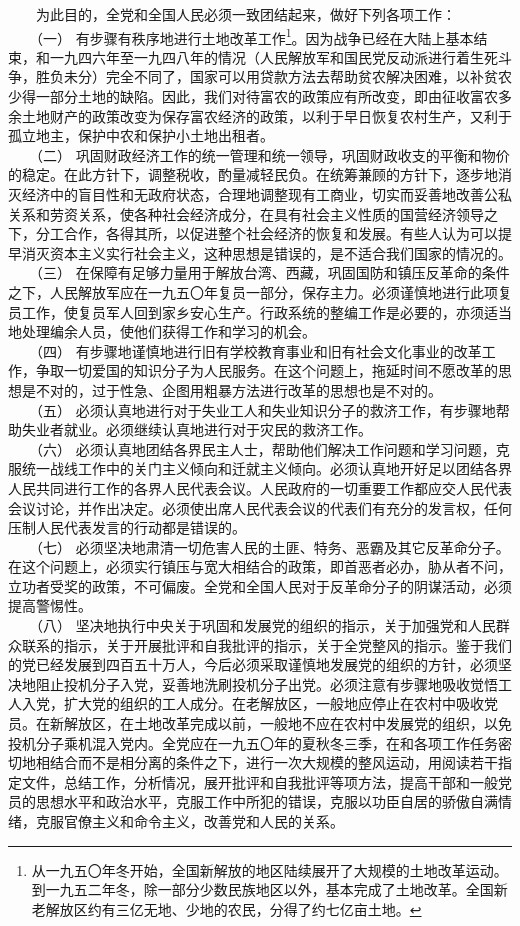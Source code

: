 \documentclass[cn,11pt,chinese]{elegantbook}
\begin{document}
　　为此目的，全党和全国人民必须一致团结起来，做好下列各项工作：\\
　　（一） 有步骤有秩序地进行土地改革工作\footnote[3]{从一九五〇年冬开始，全国新解放的地区陆续展开了大规模的土地改革运动。到一九五二年冬，除一部分少数民族地区以外，基本完成了土地改革。全国新老解放区约有三亿无地、少地的农民，分得了约七亿亩土地。}。因为战争已经在大陆上基本结束，和一九四六年至一九四八年的情况（人民解放军和国民党反动派进行着生死斗争，胜负未分）完全不同了，国家可以用贷款方法去帮助贫农解决困难，以补贫农少得一部分土地的缺陷。因此，我们对待富农的政策应有所改变，即由征收富农多余土地财产的政策改变为保存富农经济的政策，以利于早日恢复农村生产，又利于孤立地主，保护中农和保护小土地出租者。\\
　　（二） 巩固财政经济工作的统一管理和统一领导，巩固财政收支的平衡和物价的稳定。在此方针下，调整税收，酌量减轻民负。在统筹兼顾的方针下，逐步地消灭经济中的盲目性和无政府状态，合理地调整现有工商业，切实而妥善地改善公私关系和劳资关系，使各种社会经济成分，在具有社会主义性质的国营经济领导之下，分工合作，各得其所，以促进整个社会经济的恢复和发展。有些人认为可以提早消灭资本主义实行社会主义，这种思想是错误的，是不适合我们国家的情况的。\\
　　（三） 在保障有足够力量用于解放台湾、西藏，巩固国防和镇压反革命的条件之下，人民解放军应在一九五〇年复员一部分，保存主力。必须谨慎地进行此项复员工作，使复员军人回到家乡安心生产。行政系统的整编工作是必要的，亦须适当地处理编余人员，使他们获得工作和学习的机会。\\
　　（四） 有步骤地谨慎地进行旧有学校教育事业和旧有社会文化事业的改革工作，争取一切爱国的知识分子为人民服务。在这个问题上，拖延时间不愿改革的思想是不对的，过于性急、企图用粗暴方法进行改革的思想也是不对的。\\
　　（五） 必须认真地进行对于失业工人和失业知识分子的救济工作，有步骤地帮助失业者就业。必须继续认真地进行对于灾民的救济工作。\\
　　（六） 必须认真地团结各界民主人士，帮助他们解决工作问题和学习问题，克服统一战线工作中的关门主义倾向和迁就主义倾向。必须认真地开好足以团结各界人民共同进行工作的各界人民代表会议。人民政府的一切重要工作都应交人民代表会议讨论，并作出决定。必须使出席人民代表会议的代表们有充分的发言权，任何压制人民代表发言的行动都是错误的。\\
　　（七） 必须坚决地肃清一切危害人民的土匪、特务、恶霸及其它反革命分子。在这个问题上，必须实行镇压与宽大相结合的政策，即首恶者必办，胁从者不问，立功者受奖的政策，不可偏废。全党和全国人民对于反革命分子的阴谋活动，必须提高警惕性。\\
　　（八） 坚决地执行中央关于巩固和发展党的组织的指示，关于加强党和人民群众联系的指示，关于开展批评和自我批评的指示，关于全党整风的指示。鉴于我们的党已经发展到四百五十万人，今后必须采取谨慎地发展党的组织的方针，必须坚决地阻止投机分子入党，妥善地洗刷投机分子出党。必须注意有步骤地吸收觉悟工人入党，扩大党的组织的工人成分。在老解放区，一般地应停止在农村中吸收党员。在新解放区，在土地改革完成以前，一般地不应在农村中发展党的组织，以免投机分子乘机混入党内。全党应在一九五〇年的夏秋冬三季，在和各项工作任务密切地相结合而不是相分离的条件之下，进行一次大规模的整风运动，用阅读若干指定文件，总结工作，分析情况，展开批评和自我批评等项方法，提高干部和一般党员的思想水平和政治水平，克服工作中所犯的错误，克服以功臣自居的骄傲自满情绪，克服官僚主义和命令主义，改善党和人民的关系。\\
\end{document}
